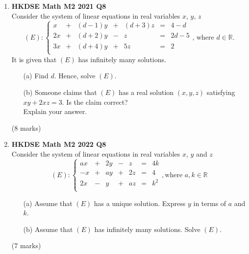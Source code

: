 \documentclass{report}
\begin{document}
\begin{enumerate}
	\item \textbf{HKDSE Math M2 2021 Q8}\\
	Consider the system of linear equations in real variables $x$, $y$, $z$
		$$(E) : \left\{\begin{matrix}
		x&  +&(d-1)y&  +&(d+3)z& = &4-d  \\
		2x&  +&(d+2)y&  -&z& = & 2d-5 \\
		3x&  +&(d+4)y&  +&5z& = & 2 \\
		\end{matrix}\right. \text{,  where } d \in \mathbb{R} .$$
		It is given that $(E)$ has infinitely many solutions.
	\begin{enumerate}
		\item [(a)] Find $d$. Hence, solve $(E)$.
		\item [(b)] Someone claims that $(E)$ has a real solution $(x,y,z)$ satisfying $xy + 2xz = 3$. Is the claim correct? \\
		Explain your answer. 
	\end{enumerate}
	(8 marks)

	\item \textbf{HKDSE Math M2 2022 Q8}\\
	Consider the system of linear equations in real variables $x$, $y$ and $z$
		$$(E) : \left\{\begin{matrix}
		ax&  +&2y&  -& z& = &4k  \\
		-x&  +&ay&  +&2z& = &4   \\
		2x&  -& y&  +&az& = &k^2 \\
		\end{matrix}\right. , \text{where } a,k \in \mathbb{R}$$
	\begin{enumerate}
		\item [(a)] Assume that $(E)$ has a unique solution. Express $y$ in terms of $a$ and $k$.
		\item [(b)] Assume that $(E)$ has infinitely many solutions. Solve $(E)$. 
	\end{enumerate}
	(7 marks)



\end{enumerate}
\end{document}
